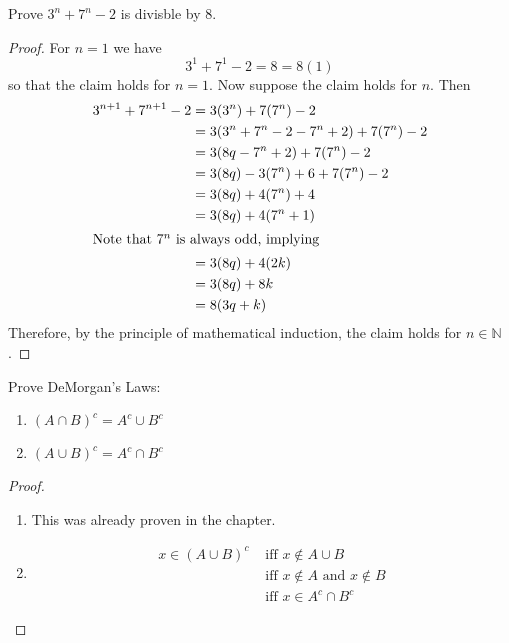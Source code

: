 \begin{exercise} \label{0.99}
	Prove \( 3^n + 7^n -2 \) is divisble by 8.
	\begin{proof}
	    For \( n = 1 \) we have
	    \[ 3^1 + 7^1 - 2 = 8 = 8(1) \]
	    so that the claim holds for \( n = 1 \). Now suppose the claim holds for \( n \). Then
	    \begin{align*}
	        3^{n+1} + 7^{n+1} - 2 &= 3(3^n) + 7(7^n) - 2 \\
	        &= 3(3^n + 7^n - 2 - 7^n + 2) + 7(7^n) - 2 \\
	        &= 3(8q - 7^n + 2) + 7(7^n) - 2 \\
	        &= 3(8q) - 3(7^n) + 6 + 7(7^n) - 2 \\
	        &= 3(8q) + 4(7^n) + 4 \\
	        &= 3(8q) + 4(7^n+1) \\
	        \intertext{Note that \( 7^n \) is always odd, implying}
	        &= 3(8q) + 4(2k) \\
	        &= 3(8q) + 8k \\
	        &= 8(3q+k)
	    \end{align*}
	    Therefore, by the principle of mathematical induction, the claim holds for \( n \in \mathbb{N} \).
	\end{proof}
\end{exercise}

\begin{exercise} \label{0.100}
	Prove DeMorgan's Laws:
	\begin{enumerate}
	    \item \( \left( A \cap B \right)^c = A^c \cup B^c\)
	    \item \( \left( A \cup B \right)^c = A^c \cap B^c\)
	\end{enumerate}
	
	\begin{proof}
	    \begin{enumerate}
	        \item This was already proven in the chapter.
	        \item
	        \begin{align*}
	            x \in (A \cup B)^c &\text{  iff  } x \not\in A \cup B \\
	            &\text{  iff  } x \not\in A \text{ and } x \not\in B \\
	            &\text{  iff  } x \in A^c \cap B^c
	        \end{align*}
	    \end{enumerate}
	\end{proof}
\end{exercise}

